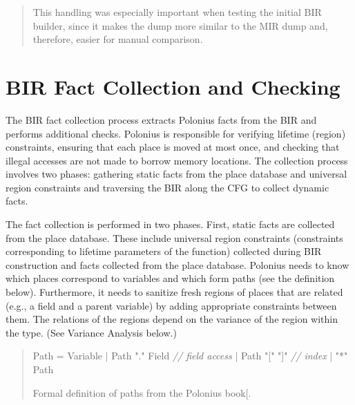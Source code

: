 \documentclass[
  11pt,
  twoside]{report}
\newenvironment{Shaded}{}{}
\newcommand{\CommentTok}[1]{\textit{#1}}
\newcommand{\NormalTok}[1]{#1}
\newcommand{\OperatorTok}[1]{#1}
\newcommand{\StringTok}[1]{#1}
\begin{document}
\begin{quote}
This handling was especially important when testing the initial BIR
builder, since it makes the dump more similar to the MIR dump and,
therefore, easier for manual comparison.
\end{quote}

\section{BIR Fact Collection and
Checking}\label{sec:bir-fact-collection-and-checking}

The BIR fact collection process extracts Polonius facts from the BIR and
performs additional checks. Polonius is responsible for verifying
lifetime (region) constraints, ensuring that each place is moved at most
once, and checking that illegal accesses are not made to borrow memory
locations. The collection process involves two phases: gathering static
facts from the place database and universal region constraints and
traversing the BIR along the CFG to collect dynamic facts.

The fact collection is performed in two phases. First, static facts are
collected from the place database. These include universal region
constraints (constraints corresponding to lifetime parameters of the
function) collected during BIR construction and facts collected from the
place database. Polonius needs to know which places correspond to
variables and which form paths (see the definition below). Furthermore,
it needs to sanitize fresh regions of places that are related (e.g., a
field and a parent variable) by adding appropriate constraints between
them. The relations of the regions depend on the variance of the region
within the type. (See Variance Analysis below.)

\begin{quote}
\begin{Shaded}
\begin{Highlighting}[]
\NormalTok{Path }\OperatorTok{=}\NormalTok{ Variable}
     \OperatorTok{|}\NormalTok{ Path }\StringTok{"."}\NormalTok{ Field }\CommentTok{// field access}
     \OperatorTok{|}\NormalTok{ Path }\StringTok{"["} \StringTok{"]"}   \CommentTok{// index}
     \OperatorTok{|} \StringTok{"*"}\NormalTok{ Path}
\end{Highlighting}
\end{Shaded}

Formal definition of paths from the Polonius
book{[}\citeproc{ref-polonius}{10}{]}.
\end{quote}
\end{document}
